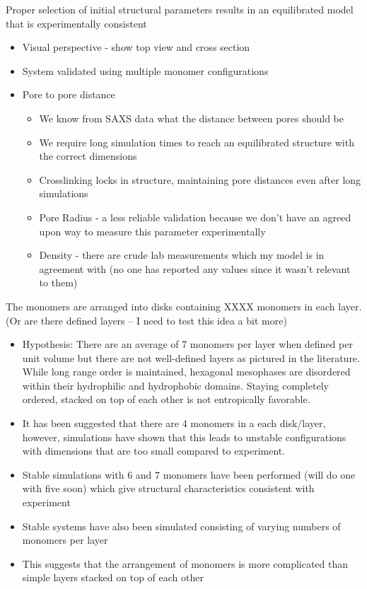 \documentclass{article}
\begin{document}
	Proper selection of initial structural parameters results in an equilibrated model that is experimentally consistent 
	\begin{itemize}
		\item Visual perspective - show top view and cross section
		\item System validated using multiple monomer configurations 
		\item Pore to pore distance
		\begin{itemize}
			\item We know from SAXS data what the distance between pores should be
			\item We require long simulation times to reach an equilibrated structure with the correct dimensions
			\item Crosslinking locks in structure, maintaining pore distances even after long simulations
		\item Pore Radius - a less reliable validation because we don't have an agreed upon way to measure this parameter experimentally
		\item Density - there are crude lab measurements which my model is in agreement with (no one has reported any values since it wasn't relevant to them)
		\end{itemize}
	\end{itemize}
	
	The monomers are arranged into disks containing XXXX monomers in each layer. (Or are there defined layers -- I need to test this idea a bit more) 
	\begin{itemize}
		\item Hypothesis: There are an average of 7 monomers per layer when defined per unit volume but there are not well-defined layers as pictured in the literature. While long range order is maintained, hexagonal mesophases are disordered within their hydrophilic and hydrophobic domains. Staying completely ordered, stacked on top of each other is not entropically favorable.
	        \item It has been suggested that there are 4 monomers in a each disk/layer, however, simulations have shown that this leads to unstable configurations with dimensions that are too small compared to experiment.
                \item Stable simulations with 6 and 7 monomers have been performed (will do one with five soon) which give structural characteristics consistent with experiment
                \item Stable systems have also been simulated consisting of varying numbers of monomers per layer
                \item This suggests that the arrangement of monomers is more complicated than simple layers stacked on top of each other
	\end{itemize}
\end{document}
